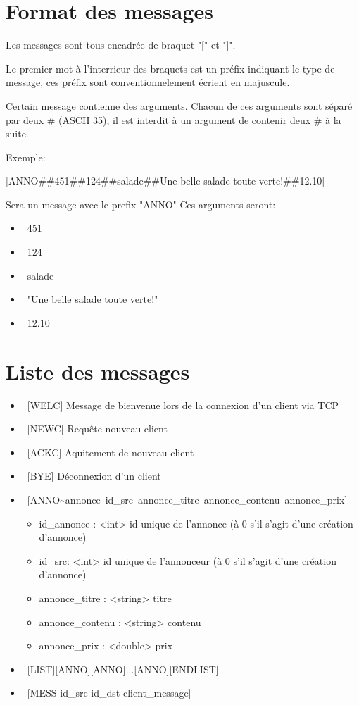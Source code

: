 \documentclass[12pt]{article}
\begin{document}
\section{Format des messages}

Les messages sont tous encadrée de braquet "[" et "]".




Le premier mot à l'interrieur des braquets est un préfix indiquant le type de message, ces préfix sont conventionnelement écrient en majuscule.

Certain message contienne des arguments. Chacun de ces arguments sont séparé par deux \# (ASCII 35), 
il est interdit à un argument de contenir deux \# à la suite.

Exemple: 

[ANNO\#\#451\#\#124\#\#salade\#\#Une belle salade toute verte!\#\#12.10] 

Sera un message avec le prefix "ANNO"
Ces arguments seront:
\begin{itemize}
  \item~451
  \item~124
  \item~salade
  \item~"Une belle salade toute verte!"
  \item~12.10
\end{itemize}



\section{Liste des messages}

\begin{itemize}
  \item~[WELC] Message de bienvenue lors de la connexion d'un client via TCP
  \item~[NEWC] Requête nouveau client
  \item~[ACKC] Aquitement de nouveau client
  \item~[BYE]  Déconnexion d'un client
  \item~[ANNO\textasciitilde{}\textbar{}annonce~id\_src~annonce\_titre~annonce\_contenu~annonce\_prix]
  \begin{itemize}
    \item id\_annonce : <int>  id unique de l'annonce (à 0 s'il s'agit d'une création d'annonce)
    \item id\_src: <int> id unique de l'annonceur (à 0 s'il s'agit d'une création d'annonce)
    \item annonce\_titre : <string> titre
    \item annonce\_contenu : <string> contenu
    \item annonce\_prix : <double> prix
  \end{itemize}
  \item~[LIST][ANNO][ANNO]...[ANNO][ENDLIST]
  \item~[MESS id\_src id\_dst client\_message]
\end{itemize}
\end{document}
